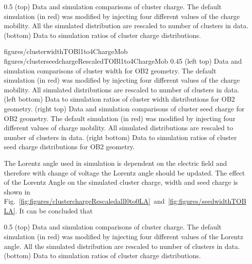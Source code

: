                  {0.5}       %
                 { (top) Data and simulation comparisons of cluster charge. The default simulation (in red) was modified by injecting four different values of the charge mobility. All the simulated distribution are rescaled to number of clusters in data. (bottom) Data to simulation ratios of cluster charge distributions. }

                 {figures/clusterwidthTOBl1to4ChargeMob}
                 {figures/clusterseedchargeRescaledTOBl1to4ChargeMob} %
                 {0.45}       %
                 {(left top) Data and simulation  comparisons of cluster width for OB2 geometry. The default simulation (in red) was modified by injecting four different values of the charge mobility. All simulated distributions are rescaled to number of clusters in data. (left bottom) Data to simulation ratios of cluster width distributions for OB2 geometry. (right top) Data and simulation  comparisons of cluster seed charge for OB2 geometry. The default simulation (in red) was modified by injecting four different values of charge mobility. All simulated distributions are rescaled to number of clusters in data. (right bottom) Data to simulation ratios of cluster seed charge distributions for OB2 geometry. }

The Lorentz angle used in simulation is dependent on the electric field and therefore with change of voltage the Lorentz angle should be updated. The effect of the Lorentz Angle on the simulated cluster charge, width and seed charge is shown in Fig.~\ref{fig:figures/clusterchargeRescaledalll0to0LA}~and~\ref{fig:figures/seedwidthTOBLA}. It can be concluded that %


                 {0.5}       %
                 { (top) Data and simulation comparisons of cluster charge. The default simulation (in red) was modified by injecting four different values of the Lorentz angle. All the simulated distribution are rescaled to number of clusters in data. (bottom) Data to simulation ratios of cluster charge distributions. }

